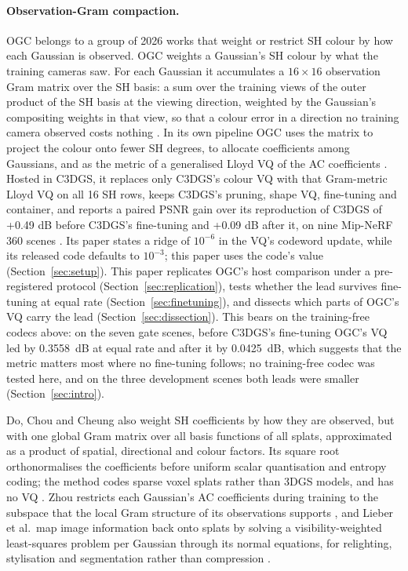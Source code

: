 \paragraph{Observation-Gram compaction.}
OGC belongs to a group of 2026 works that weight or restrict SH colour by how each Gaussian is observed.
OGC \citep{pietroszek2026only} weights a Gaussian's SH colour by what the training cameras saw.
For each Gaussian it accumulates a $16\times16$ observation Gram matrix over the SH basis: a sum over the training views of the outer product of the SH basis at the viewing direction, weighted by the Gaussian's compositing weights in that view, so that a colour error in a direction no training camera observed costs nothing \citep{pietroszek2026only}.
In its own pipeline OGC uses the matrix to project the colour onto fewer SH degrees, to allocate coefficients among Gaussians, and as the metric of a generalised Lloyd VQ of the AC coefficients \citep{pietroszek2026only}.
Hosted in C3DGS, it replaces only C3DGS's colour VQ with that Gram-metric Lloyd VQ on all 16 SH rows, keeps C3DGS's pruning, shape VQ, fine-tuning and container, and reports a paired PSNR gain over its reproduction of C3DGS of +0.49 dB before C3DGS's fine-tuning and +0.09 dB after it, on nine Mip-NeRF 360 scenes \citep{barron2022mipnerf360} \citep[Table~1 and Sec.~4.1]{pietroszek2026only}. %
Its paper states a ridge of $10^{-6}$ in the VQ's codeword update, while its released code defaults to $10^{-3}$; this paper uses the code's value (Section~\ref{sec:setup}). %
This paper replicates OGC's host comparison under a pre-registered protocol (Section~\ref{sec:replication}), tests whether the lead survives fine-tuning at equal rate (Section~\ref{sec:finetuning}), and dissects which parts of OGC's VQ carry the lead (Section~\ref{sec:dissection}). %
This bears on the training-free codecs above: on the seven gate scenes, before C3DGS's fine-tuning OGC's VQ led by 0.3558~dB at equal rate and after it by 0.0425~dB, which suggests that the metric matters most where no fine-tuning follows; no training-free codec was tested here, and on the three development scenes both leads were smaller (Section~\ref{sec:intro}). %

Do, Chou and Cheung \citep{do2026transforming} also weight SH coefficients by how they are observed, but with one global Gram matrix over all basis functions of all splats, approximated as a product of spatial, directional and colour factors.
Its square root orthonormalises the coefficients before uniform scalar quantisation and entropy coding; the method codes sparse voxel splats rather than 3DGS models, and has no VQ \citep{do2026transforming}.
Zhou restricts each Gaussian's AC coefficients during training to the subspace that the local Gram structure of its observations supports \citep{zhou2026efficient}, and Lieber et al.\ map image information back onto splats by solving a visibility-weighted least-squares problem per Gaussian through its normal equations, for relighting, stylisation and segmentation rather than compression \citep{lieber2026instant}.

